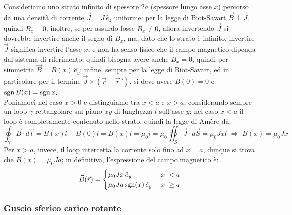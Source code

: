 \documentclass[]{article}
\begin{document}
Consideriamo uno strato infinito di spessore $ 2a $ (spessore lungo asse $ x $) percorso da una densità di corrente $ \vec{J} = J\,\hat{e}_z $ uniforme: per la legge di Biot-Savart $ \vec{B}\perp\vec{J} $, quindi $ B_z = 0 $; inoltre, se per assurdo fosse $ B_x \neq 0 $, allora invertendo $ \vec{J} $ si dovrebbe invertire anche il segno di $ B_x $, ma, dato che lo strato è infinito, invertire $ \vec{J} $ significa invertire l'asse $ x $, e non ha senso fisico che il campo magnetico dipenda dal sistema di riferimento, quindi bisogna avere anche $ B_x = 0 $, quindi per simmetria $ \vec{B} = B(x) \,\hat{e}_y $; infine, sempre per la legge di Biot-Savart, ed in particolare per il termine $ \vec{J}\times(\vec{r} - \vec{r}\,') $, si deve avere $ B(0) = 0 $ e $ \text{sgn}\,B(x) = \text{sgn}\,x $. \\ 
%
Poniamoci nel caso $ x > 0 $ e distinguiamo tra $ x < a $ e $ x > a $, considerando sempre un loop $ \gamma $ rettangolare sul piano $ xy $ di lunghezza $ l $ sull'asse $ y $: nel caso $ x < a $ il loop è completamente contenuto nello strato, quindi la legge di Amère dà:
\begin{equation}
	\oint_{\gamma} \vec{B} \cdot d\vec{l} = B(x)l - B(0)l = B(x)l = \mu_0 i = \mu_0 \oiint_S \vec{J} \cdot d\vec{S} = \mu_0 J x l \,\,\Longrightarrow\,\, B(x) = \mu_0 J x
	\label{eq:}
\end{equation}
Per $ x > a $, invece, il loop intercetta la corrente solo fino ad $ x = a $, dunque si trova che $ B(x) = \mu_0 J a $; in definitiva, l'espressione del campo magnetico è:
\begin{equation}
	\vec{B}(\vec{r}) = 
	\begin{cases}
		\mu_0 J x \, \hat{e}_y & \left\lvert x\right\rvert < a \\ 
		\mu_0 J a \,\text{sgn}(x) \,\hat{e}_y & \left\lvert x\right\rvert \ge a
	\end{cases}
	\label{eq:}
\end{equation}

\subsubsection{Guscio sferico carico rotante}
\end{document}
